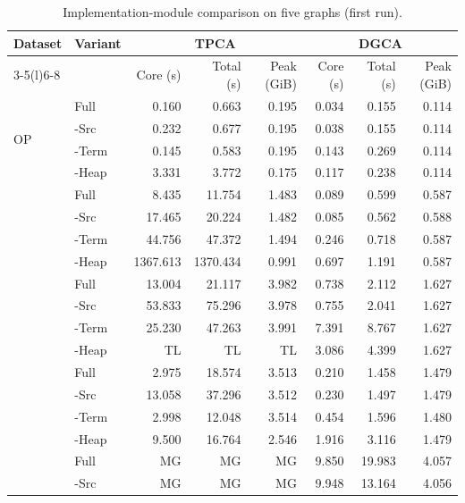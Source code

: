 \begin{table}[t]
\centering
\caption{Implementation-module comparison on five graphs (first run).}
\label{tab:TS1_module_ablation_detailed_r1}
\small
\setlength{\tabcolsep}{4pt}
\begin{tabular*}{\textwidth}{@{\extracolsep{\fill}}llrrrrrr@{}}
\toprule
\multirow{2}{*}{Dataset} & \multirow{2}{*}{Variant} & \multicolumn{3}{c}{TPCA} & \multicolumn{3}{c}{DGCA} \\
\cmidrule(lr){3-5}\cmidrule(l){6-8}
 &  & Core (s) & Total (s) & Peak (GiB) & Core (s) & Total (s) & Peak (GiB) \\
\midrule
\multirow{4}{*}{OP} & Full & 0.160 & 0.663 & 0.195 & 0.034 & 0.155 & 0.114 \\
 & -Src & 0.232 & 0.677 & 0.195 & 0.038 & 0.155 & 0.114 \\
 & -Term & 0.145 & 0.583 & 0.195 & 0.143 & 0.269 & 0.114 \\
 & -Heap & 3.331 & 3.772 & 0.175 & 0.117 & 0.238 & 0.114 \\
\addlinespace[4pt]
\multirow{4}{*}{Yelp} & Full & 8.435 & 11.754 & 1.483 & 0.089 & 0.599 & 0.587 \\
 & -Src & 17.465 & 20.224 & 1.482 & 0.085 & 0.562 & 0.588 \\
 & -Term & 44.756 & 47.372 & 1.494 & 0.246 & 0.718 & 0.587 \\
 & -Heap & 1367.613 & 1370.434 & 0.991 & 0.697 & 1.191 & 0.587 \\
\addlinespace[4pt]
\multirow{4}{*}{VG} & Full & 13.004 & 21.117 & 3.982 & 0.738 & 2.112 & 1.627 \\
 & -Src & 53.833 & 75.296 & 3.978 & 0.755 & 2.041 & 1.627 \\
 & -Term & 25.230 & 47.263 & 3.991 & 7.391 & 8.767 & 1.627 \\
 & -Heap & TL & TL & TL & 3.086 & 4.399 & 1.627 \\
\addlinespace[4pt]
\multirow{4}{*}{TG} & Full & 2.975 & 18.574 & 3.513 & 0.210 & 1.458 & 1.479 \\
 & -Src & 13.058 & 37.296 & 3.512 & 0.230 & 1.497 & 1.479 \\
 & -Term & 2.998 & 12.048 & 3.514 & 0.454 & 1.596 & 1.480 \\
 & -Heap & 9.500 & 16.764 & 2.546 & 1.916 & 3.116 & 1.479 \\
\addlinespace[4pt]
\multirow{4}{*}{SO} & Full & MG & MG & MG & 9.850 & 19.983 & 4.057 \\
 & -Src & MG & MG & MG & 9.948 & 13.164 & 4.056 \\

\end{tabular*}
\end{table}
